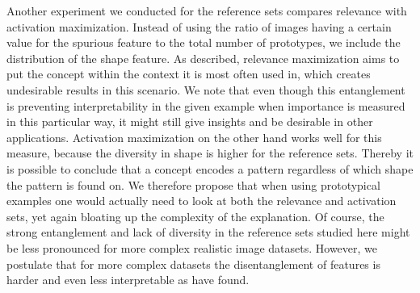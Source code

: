 Another experiment we conducted for the reference sets compares relevance with activation maximization. Instead of using the ratio of images having a certain value for the spurious feature to the total number of prototypes, we include the distribution of the shape feature. As described, relevance maximization aims to put the concept within the context it is most often used in, which creates undesirable results in this scenario. We note that even though this entanglement is preventing interpretability in the given example when importance is measured in this particular way, it might still give insights and be desirable in other applications.
Activation maximization on the other hand works well for this measure, because the diversity in shape is higher for the reference sets. Thereby it is possible to conclude that a concept encodes a pattern regardless of which shape the pattern is found on.
We therefore propose that when using prototypical examples one would actually need to look at both the relevance and activation sets, yet again bloating up the complexity of the explanation. 
Of course, the strong entanglement and lack of diversity in the reference sets studied here might be less pronounced for more complex realistic image datasets. However, we postulate that for more complex datasets the disentanglement of features is harder and even less interpretable as \cite{Traeuble2021} have found.

